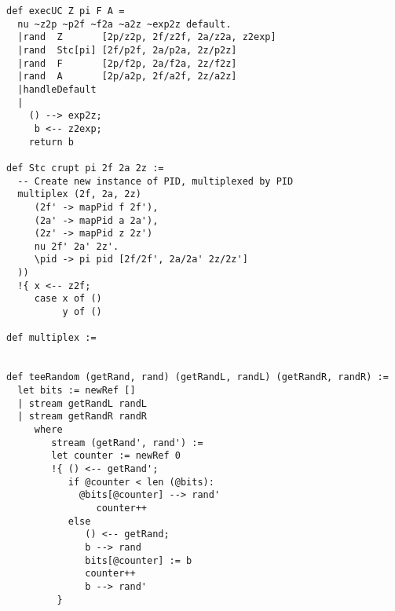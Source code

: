 \begin{figure*}
\begin{lstlisting} 
def execUC Z pi F A =
  nu ~z2p ~p2f ~f2a ~a2z ~exp2z default.
  |rand  Z       [2p/z2p, 2f/z2f, 2a/z2a, z2exp]
  |rand  Stc[pi] [2f/p2f, 2a/p2a, 2z/p2z]
  |rand  F       [2p/f2p, 2a/f2a, 2z/f2z]
  |rand  A       [2p/a2p, 2f/a2f, 2z/a2z]
  |handleDefault 
  | 
    () --> exp2z;
     b <-- z2exp;
    return b

def Stc crupt pi 2f 2a 2z :=
  -- Create new instance of PID, multiplexed by PID
  multiplex (2f, 2a, 2z) 
     (2f' -> mapPid f 2f'),
     (2a' -> mapPid a 2a'),
     (2z' -> mapPid z 2z')
     nu 2f' 2a' 2z'.
     \pid -> pi pid [2f/2f', 2a/2a' 2z/2z']
  ))
  !{ x <-- z2f; 
     case x of ()
          y of ()

def multiplex :=
   

def teeRandom (getRand, rand) (getRandL, randL) (getRandR, randR) :=
  let bits := newRef []
  | stream getRandL randL
  | stream getRandR randR
     where
        stream (getRand', rand') :=
        let counter := newRef 0
        !{ () <-- getRand';
           if @counter < len (@bits):
             @bits[@counter] --> rand'
                counter++
           else
              () <-- getRand; 
              b --> rand
              bits[@counter] := b
              counter++
              b --> rand'
         }
\end{lstlisting}
\end{figure*}
